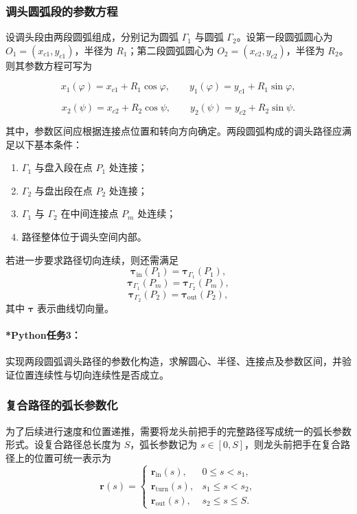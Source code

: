 \documentclass[12pt,a4paper]{ctexart}
\begin{document}
\subsubsection{调头圆弧段的参数方程}
设调头段由两段圆弧组成，分别记为圆弧 $\Gamma_1$ 与圆弧 $\Gamma_2$。设第一段圆弧圆心为 $O_1=(x_{c1},y_{c1})$，半径为 $R_1$；第二段圆弧圆心为 $O_2=(x_{c2},y_{c2})$，半径为 $R_2$。则其参数方程可写为

\begin{equation}
x_1(\varphi)=x_{c1}+R_1\cos\varphi,\qquad
y_1(\varphi)=y_{c1}+R_1\sin\varphi,
\end{equation}

\begin{equation}
x_2(\psi)=x_{c2}+R_2\cos\psi,\qquad
y_2(\psi)=y_{c2}+R_2\sin\psi.
\end{equation}

其中，参数区间应根据连接点位置和转向方向确定。两段圆弧构成的调头路径应满足以下基本条件：

\begin{enumerate}
    \item $\Gamma_1$ 与盘入段在点 $P_1$ 处连接；
    \item $\Gamma_2$ 与盘出段在点 $P_2$ 处连接；
    \item $\Gamma_1$ 与 $\Gamma_2$ 在中间连接点 $P_m$ 处连续；
    \item 路径整体位于调头空间内部。
\end{enumerate}

若进一步要求路径切向连续，则还需满足
\begin{equation}
\bm{\tau}_{\mathrm{in}}(P_1)=\bm{\tau}_{\Gamma_1}(P_1),
\end{equation}
\begin{equation}
\bm{\tau}_{\Gamma_1}(P_m)=\bm{\tau}_{\Gamma_2}(P_m),
\end{equation}
\begin{equation}
\bm{\tau}_{\Gamma_2}(P_2)=\bm{\tau}_{\mathrm{out}}(P_2),
\end{equation}
其中 $\bm{\tau}$ 表示曲线切向量。

\paragraph{*Python任务3：}
实现两段圆弧调头路径的参数化构造，求解圆心、半径、连接点及参数区间，并验证位置连续性与切向连续性是否成立。

\subsubsection{复合路径的弧长参数化}
为了后续进行速度和位置递推，需要将龙头前把手的完整路径写成统一的弧长参数形式。设复合路径总长度为 $S$，弧长参数记为 $s\in[0,S]$，则龙头前把手在复合路径上的位置可统一表示为
\begin{equation}
\bm{r}(s)=
\begin{cases}
\bm{r}_{\mathrm{in}}(s), & 0\le s<s_1,\\
\bm{r}_{\mathrm{turn}}(s), & s_1\le s<s_2,\\
\bm{r}_{\mathrm{out}}(s), & s_2\le s\le S.
\end{cases}
\end{equation}
\end{document}

